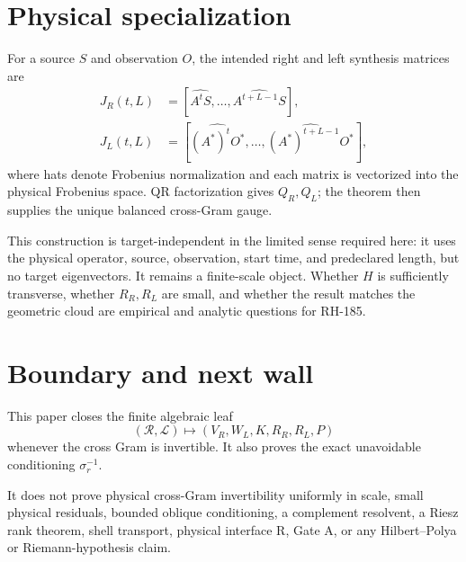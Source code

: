 \documentclass[12pt]{article}
\theoremstyle{remark}
\newcommand{\cR}{\mathcal R}
\newcommand{\cL}{\mathcal L}
\begin{document}
\section{Physical specialization}

For a source $S$ and observation $O$, the intended right and left synthesis
matrices are
\begin{align}
 J_R(t,L)&=[\widehat{A^tS},\ldots,
 \widehat{A^{t+L-1}S}],
 \label{eq:right-krylov}\\
 J_L(t,L)&=[\widehat{(A^*)^tO^*},\ldots,
 \widehat{(A^*)^{t+L-1}O^*}],
 \label{eq:left-krylov}
\end{align}
where hats denote Frobenius normalization and each matrix is vectorized into
the physical Frobenius space.  QR factorization gives $Q_R,Q_L$; the theorem
then supplies the unique balanced cross-Gram gauge.

This construction is target-independent in the limited sense required here:
it uses the physical operator, source, observation, start time, and
predeclared length, but no target eigenvectors.  It remains a finite-scale
object.  Whether $H$ is sufficiently transverse, whether $R_R,R_L$ are
small, and whether the result matches the geometric cloud are empirical and
analytic questions for RH-185.

\section{Boundary and next wall}

This paper closes the finite algebraic leaf
\begin{equation}\label{eq:closed-leaf}
 (\cR,\cL)\longmapsto(V_R,W_L,K,R_R,R_L,P)
\end{equation}
whenever the cross Gram is invertible.  It also proves the exact unavoidable
conditioning $\sigma_r^{-1}$.

It does not prove physical cross-Gram invertibility uniformly in scale,
small physical residuals, bounded oblique conditioning, a complement
resolvent, a Riesz rank theorem, shell transport, physical interface R,
Gate A, or any Hilbert--Polya or Riemann-hypothesis claim.



\end{document}
